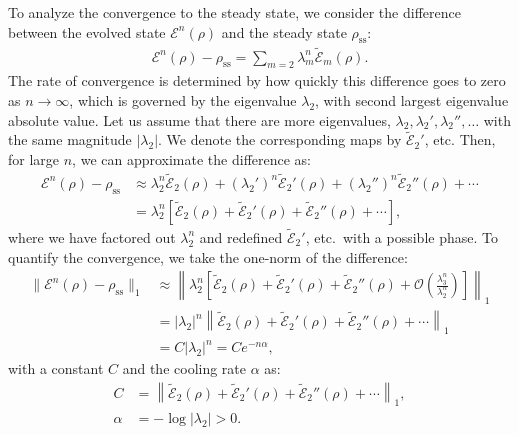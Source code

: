 To analyze the convergence to the steady state, we consider the difference between the evolved state $\mathcal{E}^n(\rho)$ and the steady state $\rho_\text{ss}$:
\begin{align}
    \mathcal{E}^n(\rho) - \rho_\text{ss} = \sum_{m=2} \lambda_m^n \tilde{\mathcal{E}}_m(\rho).
    \label{eq:difference_evolved_steadystate}
\end{align}
The rate of convergence is determined by how quickly this difference goes to zero as $n \to \infty$, which is governed by the eigenvalue $\lambda_2$, with second largest eigenvalue absolute value. Let us assume that there are more eigenvalues, $\lambda_2, \lambda_2', \lambda_2'', \ldots$ with the same magnitude $|\lambda_2|$. We denote the corresponding maps by $\tilde{\mathcal{E}}_2'$, etc. Then, for large $n$, we can approximate the difference as:
\begin{align}
    \mathcal{E}^n(\rho) - \rho_\text{ss} &\approx \lambda_2^n \tilde{\mathcal{E}}_2(\rho) + (\lambda_2')^n \tilde{\mathcal{E}}_2'(\rho) + (\lambda_2'')^n \tilde{\mathcal{E}}_2''(\rho) + \cdots \nonumber\\
                                         &= \lambda_2^n \left[ \tilde{\mathcal{E}}_2(\rho) + \tilde{\mathcal{E}}_2'(\rho) + \tilde{\mathcal{E}}_2''(\rho) + \cdots \right],
    \label{eq:difference_evolved_steadystate_approx}
\end{align}
where we have factored out $\lambda_2^n$ and redefined $\tilde{\mathcal{E}}_2'$, etc.~with a possible phase.
To quantify the convergence, we take the one-norm of the difference:
\begin{align}
    \|\mathcal{E}^n(\rho) - \rho_\text{ss}\|_1 &\approx \left\| \lambda_2^n \left[ \tilde{\mathcal{E}}_2(\rho) + \tilde{\mathcal{E}}_2'(\rho) + \tilde{\mathcal{E}}_2''(\rho) + \mathcal{O}\left(\frac{\lambda_3^n}{\lambda_2^n}\right)\right] \right\|_1 \nonumber\\
                                               &= |\lambda_2|^n \left\| \tilde{\mathcal{E}}_2(\rho) + \tilde{\mathcal{E}}_2'(\rho) + \tilde{\mathcal{E}}_2''(\rho) + \cdots \right\|_1\nonumber\\
                                               &= C |\lambda_2|^n = C e^{-n\alpha},
    \label{eq:norm_difference_evolved_steadystate}
\end{align}
with a constant $C$ and the cooling rate $\alpha$ as:
\begin{align}
    C      &= \left\| \tilde{\mathcal{E}}_2(\rho) + \tilde{\mathcal{E}}_2'(\rho) + \tilde{\mathcal{E}}_2''(\rho) + \cdots \right\|_1,\\
    \alpha &= -\log |\lambda_2| > 0.
    \label{eq:constant_C_definition}
\end{align}

